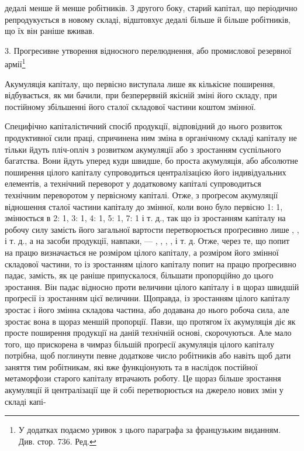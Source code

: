 дедалі менше й менше робітників. З другого боку, старий капітал,
що періодично репродукується в новому складі, відштовхує
дедалі більше й більше робітників, що їх він раніше вживав.

3. Прогресивне утворення відносного перелюднення,
або промислової резервної армії\footnote*{
У додатках подаємо уривок з цього параграфа за французьким
виданням. Див. стор. 736. Ред.
}

Акумуляція капіталу, що первісно виступала лише як кількісне
поширення, відбувається, як ми бачили, при безперервній
якісній зміні його складу, при постійному збільшенні його сталої
складової частини коштом змінної.

Специфічно капіталістичний спосіб продукції, відповідний
до нього розвиток продуктивної сили праці, спричинена ним
зміна в органічному складі капіталу не тільки йдуть пліч-опліч
з розвитком акумуляції або з зростанням суспільного багатства.
Вони йдуть уперед куди швидше, бо проста акумуляція,
або абсолютне поширення цілого капіталу супроводиться централізацією
його індивідуальних елементів, а технічний переворот
у додатковому капіталі супроводиться технічним переворотом
у первісному капіталі. Отже, з проґресом акумуляції
відношення сталої частини капіталу до змінної, коли воно було
первісно 1: 1, змінюється в 2: 1, 3: 1, 4: 1, 5: 1, 7: 1 і т. д.,
так що із зростанням капіталу на робочу силу замість  його
загальної вартости перетворюється проґресивно лише , ,
   і т. д., а на засоби продукції, навпаки, — , , ,
,  і т. д. Отже, через те, що попит на працю визначається не
розміром цілого капіталу, а розміром його змінної складової
частини, то із зростанням цілого капіталу попит на працю проґресивно
падає, замість, як це раніше припускалося, більшати
пропорційно до цього зростання. Він падає відносно проти величини
цілого капіталу і в щораз швидшій проґресії із зростанням
цієї величини. Щоправда, із зростанням цілого капіталу зростає
і його змінна складова частина, або додавана до нього робоча
сила, але зростає вона в щораз меншій пропорції. Павзи, що протягом
їх акумуляція діє як просте поширення продукції на
даній технічній основі, скорочуються. Але мало того, що прискорена
в чимраз більшій проґресії акумуляція цілого капіталу
потрібна, щоб поглинути певне додаткове число робітників або
навіть щоб дати заняття тим робітникам, які вже функціонують
та в наслідок постійної метаморфози старого капіталу втрачають
роботу. Це щораз більше зростання акумуляції й централізації
ще й собі перетворюється на джерело нових змін у складі капі-